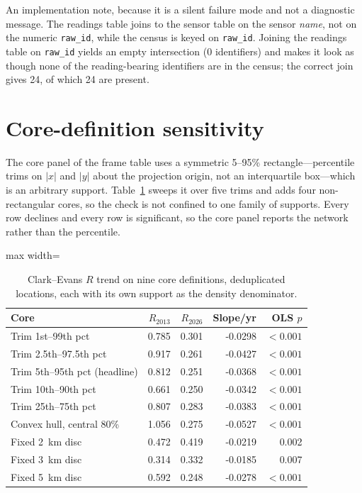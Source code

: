 \documentclass[fleqn,10pt]{wlpeerj}
\begin{document}
An implementation note, because it is a silent failure mode and not a diagnostic
message. The readings table joins to
the sensor table on the sensor \emph{name}, not on the numeric \texttt{raw\_id}, while the
census is keyed on \texttt{raw\_id}. Joining the readings table on \texttt{raw\_id} yields an
empty intersection (0 identifiers) and makes it look as though none of the
reading-bearing identifiers are in the census; the correct join gives 24, of which
24 are present.

\section{Core-definition sensitivity}
\label{si:coredef}

The core panel of the frame table uses a symmetric 5--95\% rectangle---percentile trims on $|x|$
and $|y|$ about the projection origin, not an interquartile box---which is an arbitrary
support. Table~\ref{si:core} sweeps it over five trims and adds four non-rectangular cores, so
the check is not confined to one family of supports. Every row declines and every row is
significant, so the core panel reports the network rather than the percentile.

\begin{table}[H]
\centering
\caption{Clark--Evans $R$ trend on nine core definitions, deduplicated locations, each with its
own support as the density denominator.}
\label{si:core}
\small
\begin{adjustbox}{max width=\linewidth}
\begin{tabular}{lrrrr}
\toprule
Core & $R_{2013}$ & $R_{2026}$ & Slope/yr & OLS $p$ \\
\midrule
Trim 1st--99th pct & 0.785 & 0.301 & -0.0298 & $<0.001$ \\
Trim 2.5th--97.5th pct & 0.917 & 0.261 & -0.0427 & $<0.001$ \\
Trim 5th--95th pct (headline) & 0.812 & 0.251 & -0.0368 & $<0.001$ \\
Trim 10th--90th pct & 0.661 & 0.250 & -0.0342 & $<0.001$ \\
Trim 25th--75th pct & 0.807 & 0.283 & -0.0383 & $<0.001$ \\
Convex hull, central 80\% & 1.056 & 0.275 & -0.0527 & $<0.001$ \\
Fixed \SI{2}{\kilo\meter} disc & 0.472 & 0.419 & -0.0219 & 0.002 \\
Fixed \SI{3}{\kilo\meter} disc & 0.314 & 0.332 & -0.0185 & 0.007 \\
Fixed \SI{5}{\kilo\meter} disc & 0.592 & 0.248 & -0.0278 & $<0.001$ \\
\bottomrule
\end{tabular}
\end{adjustbox}
\end{table}
\end{document}
